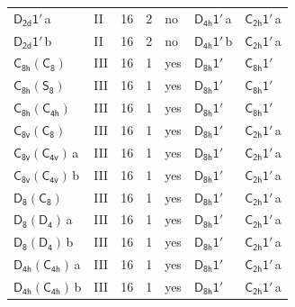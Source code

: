 \documentclass[10pt,a4paper]{article}
\numberwithin{equation}{section}
\newcommand{\grp}[1]{\mathsf{#1}}
\newcommand{\clsletter}[1]{\,{\scriptsize\color{black!55}#1}}
\begin{document}
{\begin{longtable}{@{}llrrlll@{}}
\href{D2d-1p.pdf}{$\grp{D_{2d}1'}$}\clsletter{a} & II & 16 & 2 & no & \href{D4h-1p.pdf}{$\grp{D_{4h}1'}$}\clsletter{a} & \href{C2h-1p.pdf}{$\grp{C_{2h}1'}$}\clsletter{a}\\
\href{D2d-1p.pdf}{$\grp{D_{2d}1'}$}\clsletter{b} & II & 16 & 2 & no & \href{D4h-1p.pdf}{$\grp{D_{4h}1'}$}\clsletter{b} & \href{C2h-1p.pdf}{$\grp{C_{2h}1'}$}\clsletter{a}\\
\href{C8h-C8.pdf}{$\grp{C_{8h}}(\grp{C_{8}})$} & III & 16 & 1 & yes & \href{D8h-1p.pdf}{$\grp{D_{8h}1'}$} & \href{C8h-1p.pdf}{$\grp{C_{8h}1'}$}\\
\href{C8h-S8.pdf}{$\grp{C_{8h}}(\grp{S_{8}})$} & III & 16 & 1 & yes & \href{D8h-1p.pdf}{$\grp{D_{8h}1'}$} & \href{C8h-1p.pdf}{$\grp{C_{8h}1'}$}\\
\href{C8h-C4h.pdf}{$\grp{C_{8h}}(\grp{C_{4h}})$} & III & 16 & 1 & yes & \href{D8h-1p.pdf}{$\grp{D_{8h}1'}$} & \href{C8h-1p.pdf}{$\grp{C_{8h}1'}$}\\
\href{C8v-C8.pdf}{$\grp{C_{8v}}(\grp{C_{8}})$} & III & 16 & 1 & yes & \href{D8h-1p.pdf}{$\grp{D_{8h}1'}$} & \href{C2h-1p.pdf}{$\grp{C_{2h}1'}$}\clsletter{a}\\
\href{C8v-C4v.pdf}{$\grp{C_{8v}}(\grp{C_{4v}})$}\clsletter{a} & III & 16 & 1 & yes & \href{D8h-1p.pdf}{$\grp{D_{8h}1'}$} & \href{C2h-1p.pdf}{$\grp{C_{2h}1'}$}\clsletter{a}\\
\href{C8v-C4v.pdf}{$\grp{C_{8v}}(\grp{C_{4v}})$}\clsletter{b} & III & 16 & 1 & yes & \href{D8h-1p.pdf}{$\grp{D_{8h}1'}$} & \href{C2h-1p.pdf}{$\grp{C_{2h}1'}$}\clsletter{a}\\
\href{D8-C8.pdf}{$\grp{D_{8}}(\grp{C_{8}})$} & III & 16 & 1 & yes & \href{D8h-1p.pdf}{$\grp{D_{8h}1'}$} & \href{C2h-1p.pdf}{$\grp{C_{2h}1'}$}\clsletter{a}\\
\href{D8-D4.pdf}{$\grp{D_{8}}(\grp{D_{4}})$}\clsletter{a} & III & 16 & 1 & yes & \href{D8h-1p.pdf}{$\grp{D_{8h}1'}$} & \href{C2h-1p.pdf}{$\grp{C_{2h}1'}$}\clsletter{a}\\
\href{D8-D4.pdf}{$\grp{D_{8}}(\grp{D_{4}})$}\clsletter{b} & III & 16 & 1 & yes & \href{D8h-1p.pdf}{$\grp{D_{8h}1'}$} & \href{C2h-1p.pdf}{$\grp{C_{2h}1'}$}\clsletter{a}\\
\href{D4h-C4h.pdf}{$\grp{D_{4h}}(\grp{C_{4h}})$}\clsletter{a} & III & 16 & 1 & yes & \href{D8h-1p.pdf}{$\grp{D_{8h}1'}$} & \href{C2h-1p.pdf}{$\grp{C_{2h}1'}$}\clsletter{a}\\
\href{D4h-C4h.pdf}{$\grp{D_{4h}}(\grp{C_{4h}})$}\clsletter{b} & III & 16 & 1 & yes & \href{D8h-1p.pdf}{$\grp{D_{8h}1'}$} & \href{C2h-1p.pdf}{$\grp{C_{2h}1'}$}\clsletter{a}\\

\end{longtable}}
\end{document}
